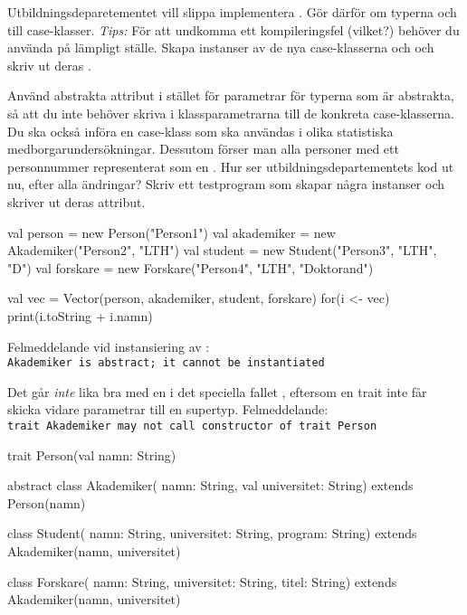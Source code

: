 \Subtask Utbildningsdeparetementet vill slippa implementera . Gör därför om typerna  och  till case-klasser. \emph{Tips:} För att undkomma ett kompileringsfel (vilket?) behöver du använda  på lämpligt ställe.
Skapa instanser av de nya case-klasserna  och  och skriv ut deras . 

\Subtask 
Använd abstrakta attribut i stället för parametrar för typerna som är abstrakta, så att du inte behöver skriva  i klassparametrarna till de konkreta case-klasserna.
Du ska också införa en case-klass  som ska användas i olika statistiska medborgarundersökningar.
Dessutom förser man alla personer med ett personnummer representerat som en .
Hur ser utbildningsdepartementets kod ut nu, efter alla ändringar? Skriv ett testprogram som skapar några instanser och skriver ut deras attribut.

\SOLUTION


\TaskSolved \what


\SubtaskSolved
\begin{Code}
val person = new Person("Person1")
val akademiker = new Akademiker("Person2", "LTH")
val student = new Student("Person3", "LTH", "D")
val forskare = new Forskare("Person4", "LTH", "Doktorand")
\end{Code}

\SubtaskSolved
\begin{Code}
val vec = Vector(person, akademiker, student, forskare)
for(i <- vec){ print(i.toString + i.namn) }
\end{Code}

\SubtaskSolved  
Felmeddelande vid instansiering av :\\
\texttt{Akademiker is abstract; it cannot be instantiated}

Det går \emph{inte} lika bra med en  i det speciella fallet , eftersom en trait inte får skicka vidare parametrar till en supertyp. Felmeddelande:\\
\texttt{trait Akademiker may not call constructor of trait Person}
\begin{Code}
trait Person(val namn: String)

abstract class Akademiker(
  namn: String,
  val universitet: String) extends Person(namn)

class Student(
  namn: String,
  universitet: String,
  program: String) extends Akademiker(namn, universitet)

class Forskare(
  namn: String,
  universitet: String,
  titel: String) extends Akademiker(namn, universitet)
\end{Code}



